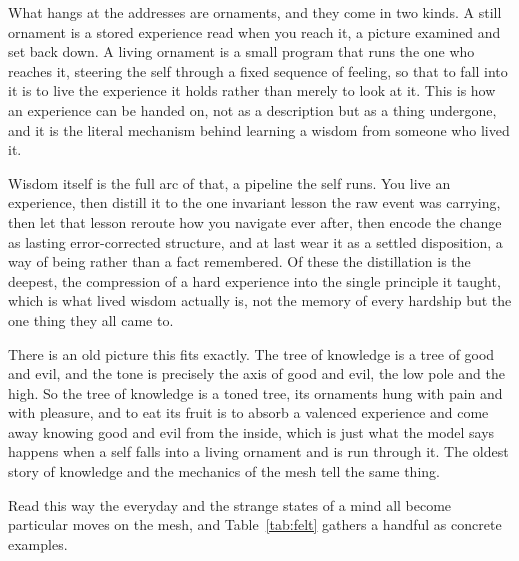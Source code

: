 What hangs at the addresses are ornaments, and they come in two kinds. A still ornament is a stored experience read when you reach it, a picture examined and set back down. A living ornament is a small program that runs the one who reaches it, steering the self through a fixed sequence of feeling, so that to fall into it is to live the experience it holds rather than merely to look at it. This is how an experience can be handed on, not as a description but as a thing undergone, and it is the literal mechanism behind learning a wisdom from someone who lived it.

Wisdom itself is the full arc of that, a pipeline the self runs. You live an experience, then distill it to the one invariant lesson the raw event was carrying, then let that lesson reroute how you navigate ever after, then encode the change as lasting error-corrected structure, and at last wear it as a settled disposition, a way of being rather than a fact remembered. Of these the distillation is the deepest, the compression of a hard experience into the single principle it taught, which is what lived wisdom actually is, not the memory of every hardship but the one thing they all came to.

There is an old picture this fits exactly. The tree of knowledge is a tree of good and evil, and the tone is precisely the axis of good and evil, the low pole and the high. So the tree of knowledge is a toned tree, its ornaments hung with pain and with pleasure, and to eat its fruit is to absorb a valenced experience and come away knowing good and evil from the inside, which is just what the model says happens when a self falls into a living ornament and is run through it. The oldest story of knowledge and the mechanics of the mesh tell the same thing.

Read this way the everyday and the strange states of a mind all become particular moves on the mesh, and Table~\ref{tab:felt} gathers a handful as concrete examples.


